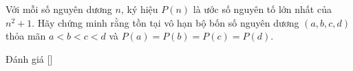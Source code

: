 \ifshowproblem
\begin{problem}\label{problem:HUN-2015-TST-KMA-643}
    Với mỗi số nguyên dương \( n \), ký hiệu \( P(n) \) là ước số nguyên tố lớn nhất của \( n^2 + 1 \).
    Hãy chứng minh rằng tồn tại vô hạn bộ bốn số nguyên dương \( (a, b, c, d) \) thỏa mãn \( a < b < c < d \) và \( P(a) = P(b) = P(c) = P(d) \).
\end{problem}
\fi

\ifshowinfo
Đánh giá [\textbf{}]
\fi